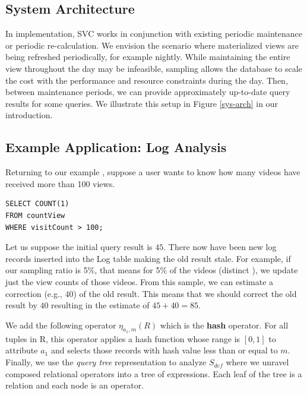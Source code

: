\subsection{System Architecture}
In implementation, SVC works in conjunction with existing periodic maintenance or periodic re-calculation.
We envision the scenario where materialized views are being refreshed periodically, for example nightly.
While maintaining the entire view throughout the day may be infeasible, sampling allows the database to scale the cost with the performance and resource constraints during the day.
Then, between maintenance periods, we can provide approximately up-to-date query results for some queries.
We illustrate this setup in Figure \ref{sys-arch} in our introduction.
 
\subsection{Example Application: Log Analysis}
Returning to our example , suppose a user wants to know how many videos have received more than 100 views.
\begin{lstlisting} 
SELECT COUNT(1)
FROM countView
WHERE visitCount > 100;
\end{lstlisting}
Let us suppose the initial query result is $45$.
There now have been new log records inserted into the Log table making the old result stale.
For example, if our sampling ratio is 5\%, that means for 5\% of the videos (distinct ), we update just the view counts of those videos.
From this sample, we can estimate a correction (e.g., $40$) of the old result.
This means that we should correct the old result by $40$ resulting in the estimate of $45+40 = 85$.

\iffalse
We add the following operator $\eta_{a_1, m}(R)$ which is the \textbf{hash} operator.
For all tuples in R, this operator applies a hash function whose range is $[0,1]$ to attribute $a_1$ and selects those records with hash value less than or equal to $m$.
Finally, we use the \emph{query tree} representation to analyze $S_{def}$ where we unravel composed relational operators into a tree of expressions.
Each leaf of the tree is a relation and each node is an operator.

